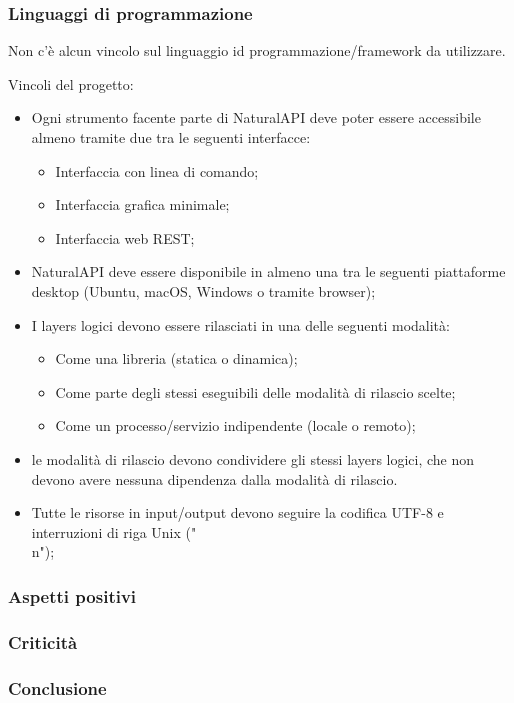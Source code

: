         \subsubsection{Linguaggi di programmazione}
        Non c'è alcun vincolo sul linguaggio id programmazione/framework da utilizzare.
        
        Vincoli del progetto:
   	\begin{itemize}
   		\item Ogni strumento facente parte di NaturalAPI deve poter essere accessibile almeno tramite due tra le seguenti interfacce:
   			\begin{itemize}
   				\item Interfaccia con linea di comando;
   				\item Interfaccia grafica minimale;
   				\item Interfaccia web REST;
   			\end{itemize}
   			\item NaturalAPI deve essere disponibile in almeno una tra le seguenti piattaforme desktop (Ubuntu, macOS, Windows o tramite browser);
   			\item I layers logici devono essere rilasciati in una delle seguenti modalità:
   				\begin{itemize}
   					\item Come una libreria (statica o dinamica);
   					\item Come parte degli stessi eseguibili delle modalità di rilascio scelte;
   					\item Come un processo/servizio indipendente (locale o remoto);
   				\end{itemize}
   			\item le modalità di rilascio devono condividere gli stessi layers logici, che non devono avere nessuna dipendenza dalla modalità di rilascio.
   			\item Tutte le risorse in input/output devono seguire la codifica UTF-8 e interruzioni di riga Unix ("\\n");
   	\end{itemize} 
    
    \subsubsection{Aspetti positivi}
    
    \subsubsection{Criticità}
    
    \subsubsection{Conclusione}